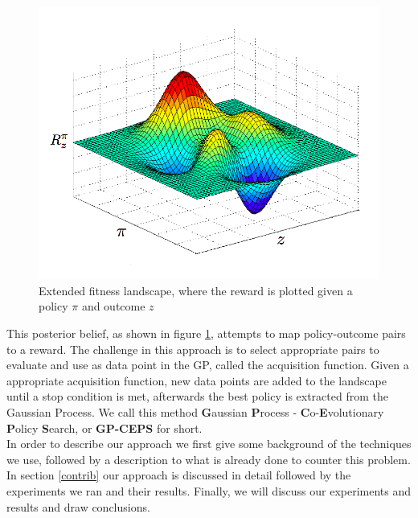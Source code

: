 \begin{figure}[ht]
  \centering
  \includegraphics[scale=0.29]{images/fitness-landscape.png}
  \caption{Extended fitness landscape, where the reward is plotted given a policy $\pi$ and outcome $z$}\label{fitnesslandscape}
\end{figure}

This posterior belief, as shown in figure \ref{fitnesslandscape}, attempts to map policy-outcome pairs to a reward. The challenge in this approach is to select appropriate pairs to evaluate and use as data point in the GP, called the acquisition function. Given a appropriate acquisition function, new data points are added to the landscape until a stop condition is met, afterwards the best policy is extracted from the Gaussian Process. We call this method \textbf{G}aussian \textbf{P}rocess - \textbf{C}o-\textbf{E}volutionary \textbf{P}olicy \textbf{S}earch, or \textbf{GP-CEPS} for short. \\


In order to describe our approach we first give some background of the techniques we use, followed by a description to what is already done to counter this problem. In section \ref{contrib} our approach is discussed in detail followed by the experiments we ran and their results. Finally, we will discuss our experiments and results and draw conclusions.

